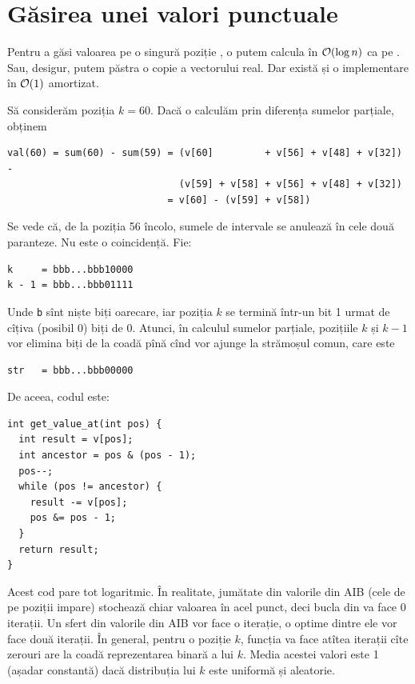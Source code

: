 \documentclass[../main.tex]{subfiles}
\begin{document}
\section{Găsirea unei valori punctuale}

Pentru a găsi valoarea pe o singură poziție , o putem calcula în $\mathcal{O}(\log n)$ ca pe . Sau, desigur, putem păstra o copie a vectorului real. Dar există și o implementare în $\mathcal{O}(1)$ amortizat.

Să considerăm poziția $k = 60$. Dacă o calculăm prin diferența sumelor parțiale, obținem

\begin{verbatim}
val(60) = sum(60) - sum(59) = (v[60]         + v[56] + v[48] + v[32]) -
                              (v[59] + v[58] + v[56] + v[48] + v[32])
                            = v[60] - (v[59] + v[58])
\end{verbatim}

Se vede că, de la poziția 56 încolo, sumele de intervale se anulează în cele două paranteze. Nu este o coincidență. Fie:

\begin{verbatim}
k     = bbb...bbb10000
k - 1 = bbb...bbb01111
\end{verbatim}

Unde \texttt{b} sînt niște biți oarecare, iar poziția $k$ se termină într-un bit 1 urmat de cîțiva (posibil 0) biți de 0. Atunci, în calculul sumelor parțiale, pozițiile $k$ și $k - 1$ vor elimina biți de la coadă pînă cînd vor ajunge la strămoșul comun, care este

\begin{verbatim}
str   = bbb...bbb00000
\end{verbatim}

De aceea, codul este:

\begin{verbatim}
int get_value_at(int pos) {
  int result = v[pos];
  int ancestor = pos & (pos - 1);
  pos--;
  while (pos != ancestor) {
    result -= v[pos];
    pos &= pos - 1;
  }
  return result;
}
\end{verbatim}

Acest cod pare tot logaritmic. În realitate, jumătate din valorile din AIB (cele de pe poziții impare) stochează chiar valoarea în acel punct, deci bucla din  va face 0 iterații. Un sfert din valorile din AIB vor face o iterație, o optime dintre ele vor face două iterații. În general, pentru o poziție $k$, funcția  va face atîtea iterații cîte zerouri are la coadă reprezentarea binară a lui $k$. Media acestei valori este 1 (așadar constantă) dacă distribuția lui $k$ este uniformă și aleatorie.
\end{document}
